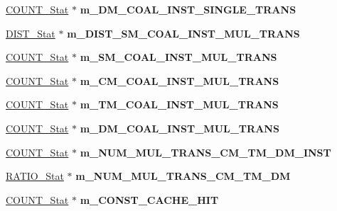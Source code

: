 \begin{DoxyCompactItemize}
\item 
\hypertarget{classall__stats__c_a2be276799260fdcd8a5e60f83d7aece4}{
\hyperlink{classCOUNT__Stat}{COUNT\_\-Stat} $\ast$ {\bfseries m\_\-DM\_\-COAL\_\-INST\_\-SINGLE\_\-TRANS}}
\label{classall__stats__c_a2be276799260fdcd8a5e60f83d7aece4}

\item 
\hypertarget{classall__stats__c_ad65b31d8e11916f7ddc7693b21237ac4}{
\hyperlink{classDIST__Stat}{DIST\_\-Stat} $\ast$ {\bfseries m\_\-DIST\_\-SM\_\-COAL\_\-INST\_\-MUL\_\-TRANS}}
\label{classall__stats__c_ad65b31d8e11916f7ddc7693b21237ac4}

\item 
\hypertarget{classall__stats__c_abf4f74d3d607f02f7ab4666c8a5d9bc3}{
\hyperlink{classCOUNT__Stat}{COUNT\_\-Stat} $\ast$ {\bfseries m\_\-SM\_\-COAL\_\-INST\_\-MUL\_\-TRANS}}
\label{classall__stats__c_abf4f74d3d607f02f7ab4666c8a5d9bc3}

\item 
\hypertarget{classall__stats__c_aeb44028650a048e119e08b8401d32155}{
\hyperlink{classCOUNT__Stat}{COUNT\_\-Stat} $\ast$ {\bfseries m\_\-CM\_\-COAL\_\-INST\_\-MUL\_\-TRANS}}
\label{classall__stats__c_aeb44028650a048e119e08b8401d32155}

\item 
\hypertarget{classall__stats__c_a748487acfc99f06d8b9b958f646961f2}{
\hyperlink{classCOUNT__Stat}{COUNT\_\-Stat} $\ast$ {\bfseries m\_\-TM\_\-COAL\_\-INST\_\-MUL\_\-TRANS}}
\label{classall__stats__c_a748487acfc99f06d8b9b958f646961f2}

\item 
\hypertarget{classall__stats__c_a4d6beb31199c1fcc6b207e29e69db350}{
\hyperlink{classCOUNT__Stat}{COUNT\_\-Stat} $\ast$ {\bfseries m\_\-DM\_\-COAL\_\-INST\_\-MUL\_\-TRANS}}
\label{classall__stats__c_a4d6beb31199c1fcc6b207e29e69db350}

\item 
\hypertarget{classall__stats__c_afd43cb6190a4d5d5b8ae18c9e6f99f3e}{
\hyperlink{classCOUNT__Stat}{COUNT\_\-Stat} $\ast$ {\bfseries m\_\-NUM\_\-MUL\_\-TRANS\_\-CM\_\-TM\_\-DM\_\-INST}}
\label{classall__stats__c_afd43cb6190a4d5d5b8ae18c9e6f99f3e}

\item 
\hypertarget{classall__stats__c_a143dbd99affe9af2afd89da04edf794a}{
\hyperlink{classRATIO__Stat}{RATIO\_\-Stat} $\ast$ {\bfseries m\_\-NUM\_\-MUL\_\-TRANS\_\-CM\_\-TM\_\-DM}}
\label{classall__stats__c_a143dbd99affe9af2afd89da04edf794a}

\item 
\hypertarget{classall__stats__c_a0c8ad5047146947b8570c00c9e4f4392}{
\hyperlink{classCOUNT__Stat}{COUNT\_\-Stat} $\ast$ {\bfseries m\_\-CONST\_\-CACHE\_\-HIT}}
\label{classall__stats__c_a0c8ad5047146947b8570c00c9e4f4392}


\end{DoxyCompactItemize}
